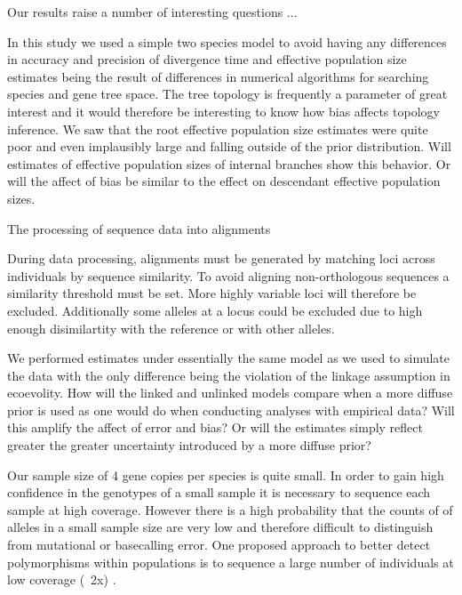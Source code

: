 Our results raise a number of interesting questions ...

In this study we used a simple two species model to avoid having any differences
in accuracy and precision of divergence time and effective population size
estimates being the result of differences in
numerical algorithms for searching species and gene tree space.
The tree topology is frequently a parameter of great interest and it would
therefore be interesting to know how bias affects topology inference.
We saw that the root effective population size estimates were quite poor and 
even implausibly large and falling outside of the prior distribution. Will
estimates of effective population sizes of internal branches show this behavior.
Or will the affect of bias be similar to the effect on descendant effective 
population sizes.




The processing of sequence data into alignments 

During data processing, alignments must be generated by matching loci across
individuals by sequence similarity. To avoid aligning non-orthologous sequences 
a similarity threshold must be set. More highly variable loci will therefore be
excluded. 
Additionally some alleles at a locus could be excluded due to high enough disimilartity
with the reference or with other alleles.



We performed estimates under essentially the same model as we used to simulate 
the data with the only difference being the violation of the linkage assumption 
in ecoevolity. 
How will the linked and unlinked models compare when a more diffuse prior is 
used as one would do when conducting analyses with empirical data?
Will this amplify the affect of error and bias? Or will the estimates simply
reflect greater the greater uncertainty introduced by a more diffuse prior?   

Our sample size of 4 gene copies per species is quite small. In order to gain high confidence
in the genotypes of a small sample it is necessary to sequence each sample at 
high coverage. However there is a high probability that the counts of of alleles 
in a small sample size are very low and therefore difficult to distinguish from
mutational or basecalling error. One proposed approach to better detect polymorphisms 
within populations is to sequence a large number of individuals at low coverage
(~2x) \citep{alexbuerklePopulationGenomicsBased2013}.



